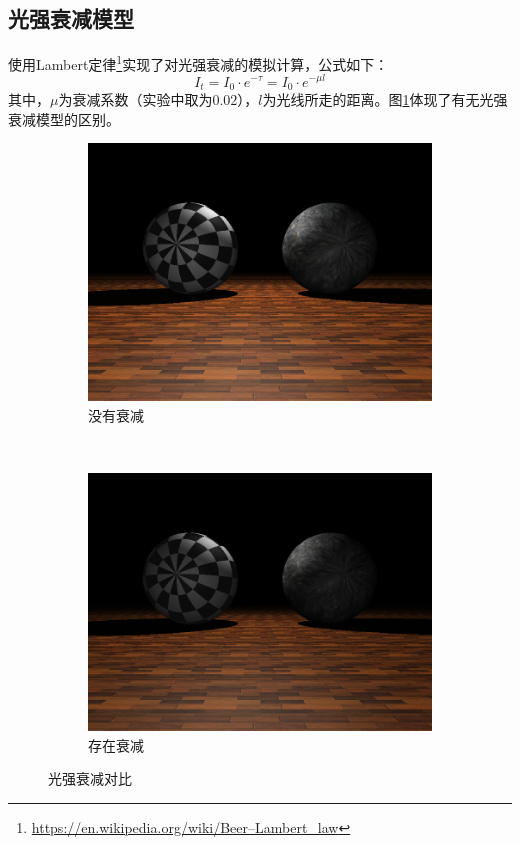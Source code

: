 \subsection {光强衰减模型}
使用Lambert定律\footnote{\url{https://en.wikipedia.org/wiki/Beer–Lambert_law}}实现了对光强衰减的模拟计算，公式如下：
\[ I_{t}=I_{0}\cdot e^{-\tau}=I_{0}\cdot e^{-\mu l} \]
其中，$\mu$为衰减系数（实验中取为$0.02$），$l$为光线所走的距离。图\ref{fig:lambert}体现了有无光强衰减模型的区别。
\begin{figure}
    \centering
    \begin{subfigure}{0.4\textwidth}
        \includegraphics[width=\textwidth]{./img/without_lambert.png}
        \caption{没有衰减}
    \end{subfigure}
    ~
    \begin{subfigure}{0.4\textwidth}
        \includegraphics[width=\textwidth]{./img/lambert.png}
        \caption{存在衰减}
    \end{subfigure}
    \caption{光强衰减对比}
    \label{fig:lambert}
\end{figure}

